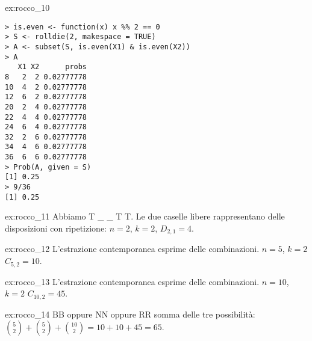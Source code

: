 \begin{sol}{ex:rocco_10}
\begin{verbatim}
> is.even <- function(x) x %% 2 == 0
> S <- rolldie(2, makespace = TRUE)
> A <- subset(S, is.even(X1) & is.even(X2))
> A
   X1 X2      probs
8   2  2 0.02777778
10  4  2 0.02777778
12  6  2 0.02777778
20  2  4 0.02777778
22  4  4 0.02777778
24  6  4 0.02777778
32  2  6 0.02777778
34  4  6 0.02777778
36  6  6 0.02777778
> Prob(A, given = S)
[1] 0.25
> 9/36
[1] 0.25
\end{verbatim}
\end{sol}


\begin{sol}{ex:rocco_11}
Abbiamo T \_ \_ T T. Le due caselle libere rappresentano delle disposizioni con ripetizione: $n=2$, $k=2$,  $D_{2,1} = 4$.

\end{sol}


\begin{sol}{ex:rocco_12}
L'estrazione contemporanea esprime delle combinazioni. 
$n=5$, $k=2$ $C_{5,2} = 10$.
\end{sol}


\begin{sol}{ex:rocco_13}
L'estrazione contemporanea esprime delle combinazioni. 
$n=10$, $k=2$ $C_{10,2} = 45$.
\end{sol}


\begin{sol}{ex:rocco_14}
BB oppure NN oppure RR somma delle tre possibilità:
$\binom{5}{2} + \binom{5}{2}  + \binom{10}{2}  = 10+10+45=65$.
\end{sol}

%
%
%





